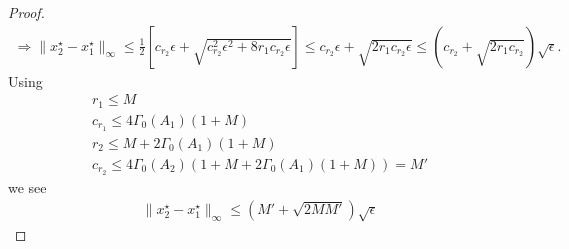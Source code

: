 \documentclass{article}
\theoremstyle{case}
\begin{document}
\begin{proof}
\begin{align*}
\Longrightarrow \|x_2^{\star} - x_1^{\star}\|_{\infty} \le \frac 1 2 \left[c_{r_2}\epsilon + \sqrt{c_{r_2}^2\epsilon^2 + 8r_1c_{r_2}\epsilon}\right] 
\le c_{r_2}\epsilon + \sqrt{2r_1c_{r_2}\epsilon}
\le \left(c_{r_2} + \sqrt{2r_1c_{r_2}}\right)\sqrt{\epsilon}.
\end{align*}
Using 
\begin{align*}
r_1 \le M \\
c_{r_1} \le 4\Gamma_0(A_1)\left(1 + M\right) \\
r_2 \le  M + 2\Gamma_0(A_1)\left(1 + M\right) \\
c_{r_2} \le  4\Gamma_0(A_2)\left(1 + M + 2\Gamma_0(A_1)\left(1 + M\right)\right) = M'
\end{align*}
we see
\begin{align*}
\|x_2^{\star} - x_1^{\star}\|_{\infty} \le \left( M' + \sqrt{2MM'}\right)\sqrt{\epsilon}
\end{align*}

\end{proof}









\end{document}
